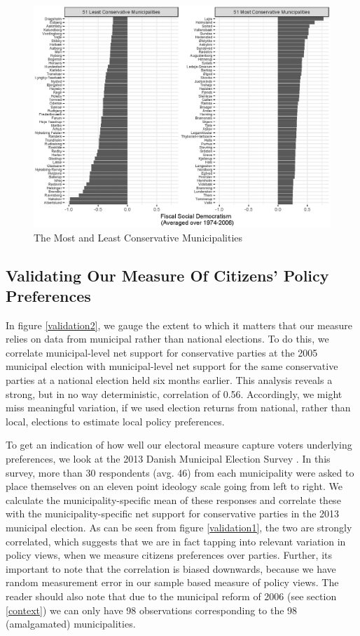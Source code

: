 \documentclass[a4paper,12pt]{article}
\begin{document}
\begin{figure}
	\centering
	\includegraphics[width=1\textwidth]{conservatism_24092018.eps}
	\caption{The Most and Least Conservative Municipalities} \label{mostleast}
\end{figure}

\clearpage


\subsection{Validating Our Measure Of Citizens' Policy Preferences} \label{validation}
In figure \ref{validation2}, we gauge the extent to which it matters that our measure relies on data from municipal rather than national elections. To do this, we correlate  municipal-level net support for conservative parties at the 2005 municipal election with municipal-level net support for the same conservative parties at a national election held six months earlier. This analysis reveals a strong, but in no way deterministic, correlation of 0.56. Accordingly, we might miss meaningful variation, if we used election returns from national, rather than local, elections to estimate local policy preferences.




To get an indication of how well our electoral measure capture voters underlying preferences, we look at the 2013 Danish Municipal Election Survey \cite{elklit2017kv13}. In this survey, more than 30 respondents (avg. 46) from each municipality were asked to place themselves on an eleven point ideology scale going from left to right. We calculate the municipality-specific mean of these responses and correlate these with the municipality-specific net support for conservative parties in the 2013 municipal election.  As can be seen from figure \ref{validation1}, the two are strongly correlated, which suggests that we are in fact tapping into relevant variation in policy views, when we measure citizens preferences over parties. Further, its important to note that the correlation is biased downwards, because we have random measurement error in our sample based measure of policy views. The reader should also note that due to the municipal reform of 2006 (see section \ref{context})  we can only have 98 observations corresponding to the 98 (amalgamated) municipalities.
\end{document}
